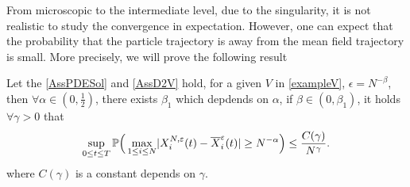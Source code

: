 \vskip5mm
From microscopic to the intermediate level, due to the singularity, it is not realistic to study the convergence in expectation. However, one can expect that the probability that the particle trajectory is away from the mean field  trajectory is small. More precisely, we will prove the following result


\begin{theorem}
Let the \autoref{AssPDESol} and \autoref{AssD2V} hold, for a given $V$ in \autoref{exampleV},
$\epsilon = N^{-\beta }$, then $\forall \alpha \in (0,\frac12)$, there exists $\beta_1$ which depdends on $\alpha$, if $ \beta  \in  (0,\beta_1) $, it holds $\forall  \gamma  > 0$ that
 \begin{align*}
  \sup_{0\leq t\leq T}\mathbb{P}\Big(  \max_{1\leq i\leq N} \lvert X^{N,\varepsilon}_i(t) - \overline{X}_i^{\varepsilon}(t)   \rvert \ge N^{-\alpha } \Big) \le \frac{C(\gamma )}{N^{\gamma } } 
 .\end{align*}
 where $C(\gamma)$ is a constant depends on $\gamma$.
\end{theorem}
